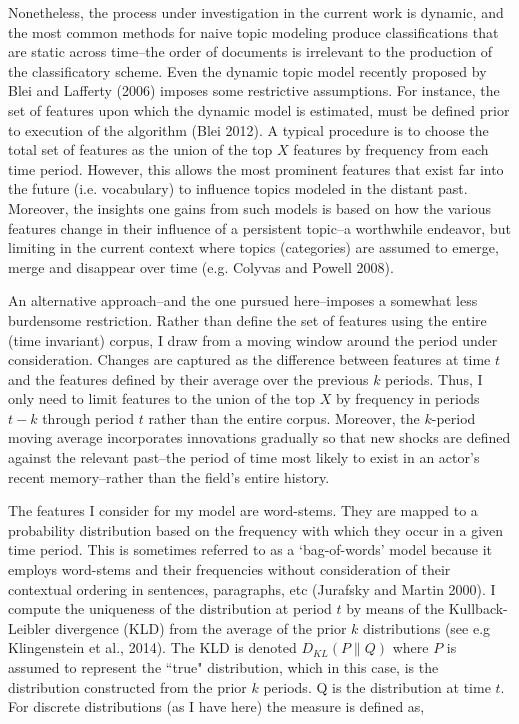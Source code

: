 Nonetheless, the process under investigation in the current work is dynamic, and the most common methods for naive topic modeling produce classifications that are static across time--the order of documents is irrelevant to the production of the classificatory scheme. Even the dynamic topic model recently proposed by Blei and Lafferty (2006) imposes some restrictive assumptions. For instance, the set of features upon which the dynamic model is estimated, must be defined prior to execution of the algorithm (Blei 2012). A typical procedure is to choose the total set of features as the union of the top $X$ features by frequency from each time period. However, this allows the most prominent features that exist far into the future (i.e. vocabulary) to influence topics modeled in the distant past. Moreover, the insights one gains from such models is based on how the various features change in their influence of a persistent topic--a worthwhile endeavor, but limiting in the current context where topics (categories) are assumed to emerge, merge and disappear over time (e.g. Colyvas and Powell 2008).

An alternative approach--and the one pursued here--imposes a somewhat less burdensome restriction. Rather than define the set of features using the entire (time invariant) corpus, I draw from a moving window around the period under consideration. Changes are captured as the difference between features at time $t$ and the features defined by their average over the previous $k$ periods. Thus, I only need to limit features to the union of the top $X$ by frequency in periods $t-k$ through period $t$ rather than the entire corpus. Moreover, the $k$-period moving average incorporates innovations gradually so that new shocks are defined against the relevant past--the period of time most likely to exist in an actor's recent memory--rather than the field's entire history. 

The features I consider for my model are word-stems. They are mapped to a probability distribution based on the frequency with which they occur in a given time period. This is sometimes referred to as a `bag-of-words' model because it employs word-stems and their frequencies without consideration of their contextual ordering in sentences, paragraphs, etc (Jurafsky and Martin 2000). I compute the uniqueness of the distribution at period $t$ by means of the Kullback-Leibler divergence (KLD) from the average of the prior $k$ distributions (see e.g Klingenstein et al., 2014). The KLD is denoted $D_{KL}(P\|Q)$ where $P$ is assumed to represent the ``true" distribution, which in this case, is the distribution constructed from the prior $k$ periods. Q is the distribution at time $t$. For discrete distributions (as I have here) the measure is defined as,

